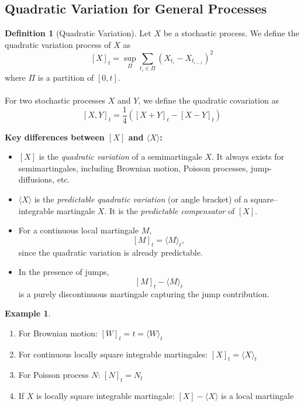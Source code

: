 \documentclass[11pt,a4paper]{article}
\theoremstyle{definition}
\newtheorem{definition}{Definition}[section]
\newtheorem{example}{Example}[section]
\begin{document}
\subsection{Quadratic Variation for General Processes}

\begin{definition}[Quadratic Variation]\label{def:quadratic_variation}
Let $X$ be a stochastic process. We define the quadratic variation process of $X$ as
\[
[X]_t = \sup_{\Pi} \sum_{t_i \in \Pi} (X_{t_i} - X_{t_{i-1}})^2
\]
where $\Pi$ is a partition of $[0,t]$.
~\\~\\
For two stochastic processes $X$ and $Y$, we define the quadratic covariation as
\[
[X,Y]_t = \frac{1}{4}([X+Y]_t - [X-Y]_t)
\]
\end{definition}
\textbf{Key differences between $[X]$ and $\langle X\rangle$:}
\begin{itemize}
    \item $[X]$ is the \emph{quadratic variation} of a semimartingale $X$.
        It always exists for semimartingales, including Brownian motion,
        Poisson processes, jump-diffusions, etc.
    \item $\langle X\rangle$ is the \emph{predictable quadratic variation}
        (or angle bracket) of a square–integrable martingale $X$.
        It is the \emph{predictable compensator} of $[X]$.
    \item For a continuous local martingale $M$,
        \[
            [M]_t = \langle M\rangle_t,
        \]
        since the quadratic variation is already predictable.
    \item In the presence of jumps,
        \[
            [M]_t - \langle M\rangle_t
        \]
        is a purely discontinuous martingale capturing the jump contribution.
\end{itemize}


\begin{example}\label{ex:qv_examples} $ $
\begin{enumerate}
    \item For Brownian motion: $[W]_t = t = \langle W \rangle_t$
    \item For continuous locally square integrable martingales: $[X]_t = \langle X \rangle_t$
    \item For Poisson process $N$: $[N]_t = N_t$
    \item If $X$ is locally square integrable martingale: $[X] - \langle X \rangle$ is a local martingale
\end{enumerate}
\end{example}
\end{document}
